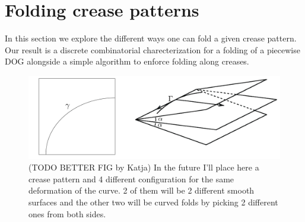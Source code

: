 \section{Folding crease patterns} \label{sec:folding}
In this section we explore the different ways one can fold a given crease pattern. Our result is a discrete combinatorial charecterization for a folding of a piecewise DOG alongside a simple algorithm to enforce folding along creases.

\begin{figure} [h]
	\centering
	\includegraphics[width=0.7\linewidth]{figures/curved_fold_through_curve.pdf}
	\caption{(TODO BETTER FIG by Katja) In the future I'll place here a crease pattern and 4 different configuration for the same deformation of the curve. 2 of them will be 2 different smooth surfaces and the other two will be curved folds by picking 2 different ones from both sides. }
	\label{fig:folding_combinatorics}
\end{figure}

